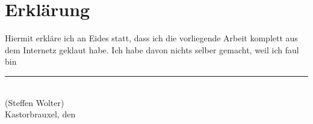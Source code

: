 
\cleardoublepage
\thispagestyle{plain}
\vspace*{\fill}

\section*{Erklärung}

Hiermit erkläre ich an Eides statt, dass ich die vorliegende
Arbeit komplett aus dem Internetz geklaut habe. Ich habe davon nichts selber gemacht, weil ich faul bin

\vskip2cm

\rule{5cm}{0.4pt}\\
(Steffen Wolter)\\
Kastorbrauxel, den \duedate